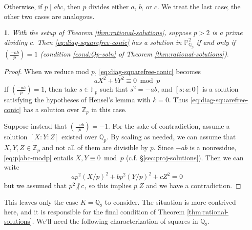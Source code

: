 \documentclass[10pt,a4paper]{amsart}
\numberwithin{equation}{section}
\numberwithin{figure}{section}
\numberwithin{table}{section}
\theoremstyle{definition}
\theoremstyle{plain}
\theoremstyle{remark}
\theoremstyle{plain}
\theoremstyle{definition}
\theoremstyle{plain}
\theoremstyle{plain}
\newtheorem{lem}[thm]{\protect\lemmaname}
\providecommand{\lemmaname}{Lemma}
\newcommand{\legendre}[2]{\genfrac{(}{)}{}{}{#1}{#2}}
\renewcommand{\P}{\mathbb{P}}
\newcommand{\F}{\mathbb{F}}
\newcommand{\Z}{\mathbb{Z}}
\newcommand{\Q}{\mathbb{Q}}
\newcommand{\ndiv}{\centernot|}
\begin{document}
	Otherwise, if $p\mid abc$, then $p$ divides either $a$, $b$, or $c$. We treat the last case; the other two cases are analogous.
	
	\begin{lem}
		With the setup of Theorem \ref{thm:rational-solutions}, suppose $p > 2$ is a prime dividing $c$. Then \eqref{eq:diag-squarefree-conic} has a solution in $\P^2_{\Q_p}$ if and only if $\legendre{-ab}{p}=1$ (condition \eqref{cond:Qp-soln} of Theorem \ref{thm:rational-solutions}).
	\end{lem}
	\begin{proof}
		When we reduce mod $p$, \eqref{eq:diag-squarefree-conic} becomes
		\begin{equation}\label{eq:p|abc-modp}
		aX^2 + bY^2 \equiv 0 \bmod p
		\end{equation}
		If $\legendre{-ab}{p}=1$, then take $s\in \F_p$ such that $s^2 = -ab$, and $[s:a:0]$ is a solution satisfying the hypotheses of Hensel's lemma with $k=0$. Thus \eqref{eq:diag-squarefree-conic} has a solution over $\Z_p$ in this case.
		
		Suppose instead that $\legendre{-ab}{p}=-1$. For the sake of contradiction, assume a solution $[X:Y:Z]$ existed over $\Q_p$. By scaling as needed, we can assume that $X,Y,Z\in \Z_p$ and not all of them are divisible by $p$. Since $-ab$ is a nonresidue, \eqref{eq:p|abc-modp} entails $X,Y \equiv 0 \bmod p$ (c.f. \S\ref{sec:proj-solutions}). Then we can write
		\[
		ap^2 (X/p)^2 + bp^2 (Y/p)^2 + cZ^2 = 0
		\]
		but we assumed that $p^2\ndiv c$, so this implies $p|Z$ and we have a contradiction.
	\end{proof}
	This leaves only the case $K = \Q_2$ to consider. The situation is more contrived here,
	and it is responsible for the final condition of Theorem 
	\ref{thm:rational-solutions}. We'll need the following characterization of squares
	in $\Q_2$.
	
\end{document}
